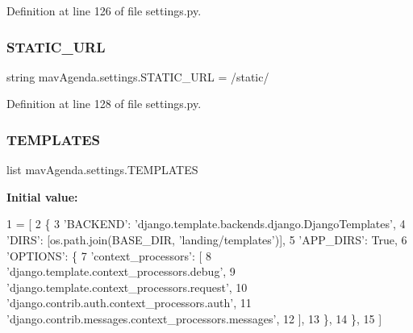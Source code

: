 Definition at line 126 of file settings.\+py.

\mbox{\label{namespacemavAgenda_1_1settings_ad7fe7173caa4166bb75d132316ea1a88}} 
\subsubsection{\texorpdfstring{S\+T\+A\+T\+I\+C\+\_\+\+U\+RL}{STATIC\_URL}}
{\footnotesize\ttfamily string mav\+Agenda.\+settings.\+S\+T\+A\+T\+I\+C\+\_\+\+U\+RL = \textquotesingle{}/static/\textquotesingle{}}



Definition at line 128 of file settings.\+py.

\mbox{\label{namespacemavAgenda_1_1settings_a17e29897dc668b9f2955407bd489d8ef}} 
\subsubsection{\texorpdfstring{T\+E\+M\+P\+L\+A\+T\+ES}{TEMPLATES}}
{\footnotesize\ttfamily list mav\+Agenda.\+settings.\+T\+E\+M\+P\+L\+A\+T\+ES}

{\bfseries Initial value\+:}
\begin{DoxyCode}
1 =  [
2     \{
3         \textcolor{stringliteral}{'BACKEND'}: \textcolor{stringliteral}{'django.template.backends.django.DjangoTemplates'},
4         \textcolor{stringliteral}{'DIRS'}: [os.path.join(BASE\_DIR, \textcolor{stringliteral}{'landing/templates'})],
5         \textcolor{stringliteral}{'APP\_DIRS'}: \textcolor{keyword}{True},
6         \textcolor{stringliteral}{'OPTIONS'}: \{
7             \textcolor{stringliteral}{'context\_processors'}: [
8                 \textcolor{stringliteral}{'django.template.context\_processors.debug'},
9                 \textcolor{stringliteral}{'django.template.context\_processors.request'},
10                 \textcolor{stringliteral}{'django.contrib.auth.context\_processors.auth'},
11                 \textcolor{stringliteral}{'django.contrib.messages.context\_processors.messages'},
12             ],
13         \},
14     \},
15 ]
\end{DoxyCode}



